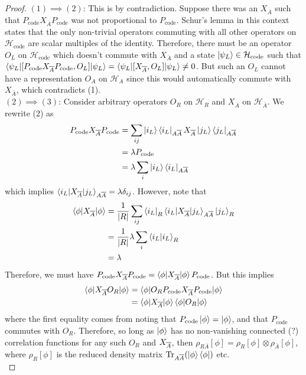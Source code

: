 \documentclass[12pt,a4paper]{article}
\numberwithin{equation}{section}
\newcommand{\ketbra}[2]{\ket{#1}\bra{#2}}
\newcommand{\ketbras}[1]{\ketbra{#1}{#1}}
\newcommand{\Pc}{P_{\text{code}}}
\newcommand{\Hcode}{\mathcal{H}_{\text{code}}}
\theoremstyle{definition}
\theoremstyle{theorem}
\theoremstyle{example}
\begin{document}
\begin{itemize}
\begin{proof}
				$(1)\implies (2)$: This is by contradiction. Suppose there was an $X_{\overline{A}}$ such that $\Pc X_{\overline{A}}\Pc$ was not proportional to $\Pc$. Schur's lemma in this context states that the only non-trivial operators commuting with all other operators on $\Hcode$ are scalar multiples of the identity. Therefore, there must be an operator $O_{L}$ on $\Hcode$ which doesn't commute with $X_{\overline{A}}$ and a state $\ket{\psi_{L}}\in\Hcode$ such that $\braket{\psi_{L}|[\Pc X_{\overline{A}}\Pc,O_{L}]|\psi_{L}}=\braket{\psi_{L}|[X_{\overline{A}},O_{L}]|\psi_{L}}\neq 0$. But such an $O_{L}$ cannot have a representation $O_{A}$ on $\mathcal{H}_{A}$ since this would automatically commute with $X_{\overline{A}}$, which contradicts (1).\\
				$(2)\implies (3)$: Consider arbitrary operators $O_{R}$ on $\mathcal{H}_{R}$ and $X_{\overline{A}}$ on $\mathcal{H}_{\overline{A}}$. We rewrite (2) as
				\begin{equation}
					\begin{aligned}
						\Pc\Xabar\Pc&=\sum_{ij}\ketbras{i_{L}}_{A\overline{A}}\Xabar\ketbras{j_{L}}_{A\overline{A}}\\&=\lambda\Pc\\&=\lambda\sum_{i}\ketbras{i_{L}}_{A\overline{A}}
					\end{aligned}
				\end{equation}
				which implies $\braket{i_{L}|X_{\overline{A}}|j_{L}}_{A\overline{A}}=\lambda\delta_{ij}$. However, note that
				\begin{equation}
					\begin{aligned}
						\braket{\phi|X_{\overline{A}}|\phi}&=\frac{1}{|R|}\sum_{ij}\bra{i_{L}}_{R}\braket{i_{L}|X_{\overline{A}}|j_{L}}_{A\overline{A}}\ket{j_{L}}_{R}\\&=\frac{1}{|R|}\lambda\sum_{i}\braket{i_{L}|i_{L}}_{R}\\&=\lambda
					\end{aligned}
				\end{equation}
				Therefore, we must have $\Pc\Xabar\Pc=\braket{\phi|\Xabar|\phi}\Pc$. But this implies
				\begin{equation}
					\begin{aligned}
						\braket{\phi|\Xabar O_{R}|\phi}&=\braket{\phi|O_{R}\Pc\Xabar\Pc|\phi}\\&=\braket{\phi|\Xabar|\phi}\braket{\phi|O_{R}|\phi}
					\end{aligned}
				\end{equation}
				where the first equality comes from noting that $\Pc\ket{\phi}=\ket{\phi}$, and that $\Pc$ commutes with $O_{R}$. Therefore, so long as $\ket{\phi}$ has no non-vanishing connected (?) correlation functions for any such $O_{R}$ and $X_{\overline{A}}$, then $\rho_{R\overline{A}}[\phi]=\rho_{R}[\phi]\otimes\rho_{\overline{A}}[\phi]$, where $\rho_{R}[\phi]$ is the reduced density matrix $\text{Tr}_{A\overline{A}}(\ketbras{\phi})$ etc.\\

\end{proof}
\end{itemize}
\end{document}
